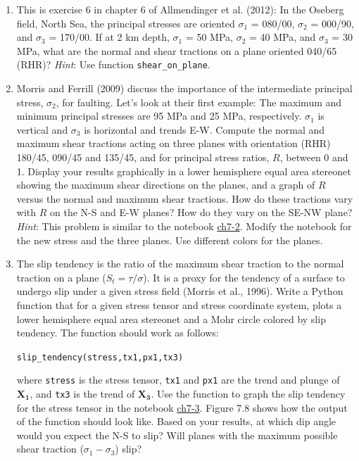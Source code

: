 \documentclass[a4paper , 12pt]{book}
\newcommand{\code}[1]{\colorbox{light-gray}{\texttt{#1}}}
\begin{document}
\begin{enumerate}
    \item This is exercise 6 in chapter 6 of Allmendinger et al. (2012): In the Oseberg field, North Sea, the principal stresses are oriented $\sigma_1$ = 080/00, $\sigma_2$ = 000/90, and $\sigma_3$ = 170/00. If at 2 km depth, $\sigma_1$ = 50 MPa, $\sigma_2$ = 40 MPa, and $\sigma_3$ = 30 MPa, what are the normal and shear tractions on a plane oriented 040/65 (RHR)? \textit{Hint}: Use function {\code{shear\_on\_plane}}.
    
    \item Morris and Ferrill (2009) discuss the importance of the intermediate principal stress, $\sigma_2$, for faulting. Let's look at their first example: The maximum and minimum principal stresses are 95 MPa and 25 MPa, respectively. $\sigma_1$ is vertical and $\sigma_3$ is horizontal and trends E-W. Compute the normal and maximum shear tractions acting on three planes with orientation (RHR) 180/45, 090/45 and 135/45, and for principal stress ratios, $R$, between 0 and 1. Display your results graphically in a lower hemisphere equal area stereonet showing the maximum shear directions on the planes, and a graph of $R$ versus the normal and maximum shear tractions. How do these tractions vary with $R$ on the N-S and E-W planes? How do they vary on the SE-NW plane? \textit{Hint}: This problem is similar to the notebook \href{https://github.com/nfcd/compGeo/blob/master/source/notebooks/ch7-2.ipynb}{ch7-2}. Modify the notebook for the new stress and the three planes. Use different colors for the planes.
    
    \item The slip tendency is the ratio of the maximum shear traction to the normal traction on a plane ($S_t=\tau/\sigma$). It is a proxy for the tendency of a surface to undergo slip under a given stress field (Morris et al., 1996). Write a Python function that for a given stress tensor and stress coordinate system, plots a lower hemisphere equal area stereonet and a Mohr circle colored by slip tendency. The function should work as follows:
    
    \begin{center}
        \code{slip\_tendency(stress,tx1,px1,tx3)}
    \end{center}
    
    where \code{stress} is the stress tensor, \code{tx1} and \code{px1} are the trend and plunge of $\mathbf{X_1}$, and \code{tx3} is the trend of $\mathbf{X_3}$. Use the function to graph the slip tendency for the stress tensor in the notebook \href{https://github.com/nfcd/compGeo/blob/master/source/notebooks/ch7-3.ipynb}{ch7-3}. Figure 7.8 shows how the output of the function should look like. Based on your results, at which dip angle would you expect the N-S to slip? Will planes with the maximum possible shear traction ($\sigma_1-\sigma_3$) slip?
    

\end{enumerate}
\end{document}
